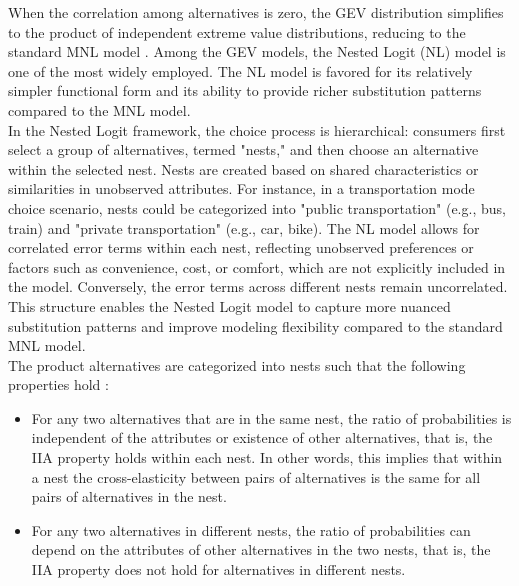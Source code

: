 \documentclass[a4paper,11pt]{article}
\begin{document}
    When the correlation among alternatives is zero, the GEV distribution simplifies to the product of independent extreme value distributions, reducing to the standard MNL model \cite{Train}. Among the GEV models, the Nested Logit (NL) model is one of the most widely employed. The NL model is favored for its relatively simpler functional form and its ability to provide richer substitution patterns compared to the MNL model.\\

    In the Nested Logit framework, the choice process is hierarchical: consumers first select a group of alternatives, termed "nests," and then choose an alternative within the selected nest. Nests are created based on shared characteristics or similarities in unobserved attributes. For instance, in a transportation mode choice scenario, nests could be categorized into "public transportation" (e.g., bus, train) and "private transportation" (e.g., car, bike). The NL model allows for correlated error terms within each nest, reflecting unobserved preferences or factors such as convenience, cost, or comfort, which are not explicitly included in the model. Conversely, the error terms across different nests remain uncorrelated. This structure enables the Nested Logit model to capture more nuanced substitution patterns and improve modeling flexibility compared to the standard MNL model.\\ 
    
    The product alternatives are categorized into nests such that the following properties hold \cite{Train}:

    \begin{itemize}
        \item For any two alternatives that are in the same nest, the ratio of probabilities is independent of the attributes or existence of other alternatives, that is, the IIA property holds within each nest. In other words, this implies that within a nest the cross-elasticity between pairs of alternatives is the same for all pairs of alternatives in the nest.
        \item For any two alternatives in different nests, the ratio of probabilities can depend on the attributes of other alternatives in the two nests, that is, the IIA property does not hold for alternatives in different nests.
    \end{itemize}
\end{document}
